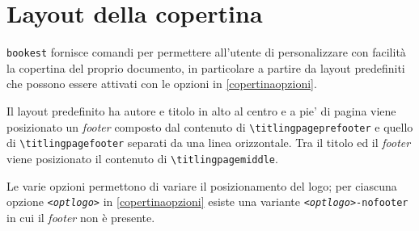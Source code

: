 \documentclass[a4paper,oneside,centered,noparindent,noparskip]{bookest}
\begin{document}
\section{Layout della copertina}
\texttt{bookest} fornisce comandi per permettere all'utente di personalizzare con facilità la copertina del proprio documento, in particolare a partire da layout predefiniti che possono essere attivati con le opzioni in \ref{copertinaopzioni}.

\ppar
Il layout predefinito ha autore e titolo in alto al centro e a pie' di pagina viene posizionato un \emph{footer} composto dal contenuto di \texttt{\textbackslash titlingpageprefooter} e quello di \texttt{\textbackslash titlingpagefooter} separati da una linea orizzontale. Tra il titolo ed il \emph{footer} viene posizionato il contenuto di \texttt{\textbackslash titlingpagemiddle}.

Le varie opzioni permettono di variare il posizionamento del logo; per ciascuna opzione \texttt{\textit{<optlogo>}} in \ref{copertinaopzioni} esiste una variante \texttt{\textit{<optlogo>}-nofooter} in cui il \emph{footer} non è presente.
\end{document}
